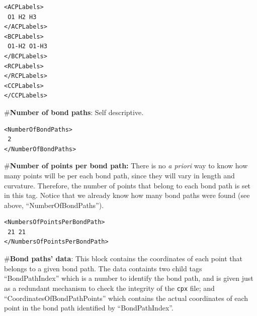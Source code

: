 \begin{verbatim}
<ACPLabels>
 O1 H2 H3
</ACPLabels>
<BCPLabels>
 O1-H2 O1-H3
</BCPLabels>
<RCPLabels>
</RCPLabels>
<CCPLabels>
</CCPLabels>
\end{verbatim}
\#\textbf{Number of bond paths}: Self descriptive.
\begin{verbatim}
<NumberOfBondPaths>
 2
</NumberOfBondPaths>
\end{verbatim}
\#\textbf{Number of points per bond path:} There is no \textit{a priori} way to know how many points will be per each bond path, since they will vary in length and curvature. Therefore, the number of points that belong to each bond path is set in this tag. Notice that we already know how many bond paths were found (see above, ``NumberOfBondPaths'').
\begin{verbatim}
<NumbersOfPointsPerBondPath>
 21 21
</NumbersOfPointsPerBondPath>
\end{verbatim}
\#\textbf{Bond paths' data}: This block contains the coordinates of each point that belongs to a given bond path. The data containts two child tags ``BondPathIndex'' which is a number to identify the bond path, and is given just as a redundant mechanism to check the integrity of the \texttt{cpx} file; and ``CoordinatesOfBondPathPoints'' which contains the actual coordinates of each point in the bond path identified by ``BondPathIndex''.
